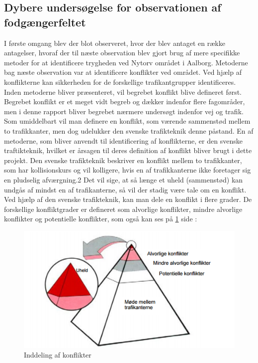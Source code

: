 \subsection{Dybere undersøgelse for observationen af fodgængerfeltet}
\label{sub:dyb_undersoelse}
I første omgang blev der blot observeret, hvor der blev antaget en række antagelser, hvoraf der til næste observation blev gjort brug af mere specifikke metoder for at identificere trygheden ved Nytorv området i Aalborg.
Metoderne bag næste observation var at identificere konflikter ved området. Ved hjælp af konflikterne kan sikkerheden for de forskellige trafikantgrupper identificeres. Inden metoderne bliver præsenteret, vil begrebet konflikt blive defineret først. Begrebet konflikt er et meget vidt begreb og dækker indenfor flere fagområder, men i denne rapport bliver begrebet nærmere undersøgt indenfor vej og trafik. Som umiddelbart vil man definere en konflikt, som værende sammenstød mellem to trafikkanter, men dog udelukker den svenske trafikteknik denne påstand.%
En af metoderne, som bliver anvendt til identificering af konflikterne, er den svenske traftikteknik, hvilket er årsagen til deres definition af konflikt bliver brugt i dette projekt.
Den svenske trafikteknik beskriver en konflikt mellem to trafikkanter, som har kollisionskurs og vil kolligere, hvis en af trafikkanterne ikke foretager sig en pludselig afværgning.2 Det vil sige, at så længe et uheld (sammenstød) kan undgås af mindst en af trafikanterne, så vil der stadig være tale om en konflikt. Ved hjælp af den svenske trafikteknik, kan man dele en konflikt i flere grader. De forskellige konfliktgrader er defineret som alvorlige konflikter, mindre alvorlige konflikter og potentielle konflikter, som også kan ses på \cref{fig:indellingkonflikter} side \pageref{fig:indellingkonflikter}:
 \begin{figure}[htbp]
   \centering
   \begin{adjustbox}{max width=\textwidth}
     \includegraphics{figures/Billederogfigur/konflikt.png} %
  \end{adjustbox}
   \caption{Inddeling af konflikter}
    \label{fig:indellingkonflikter}
 \end{figure}
 \newpage


